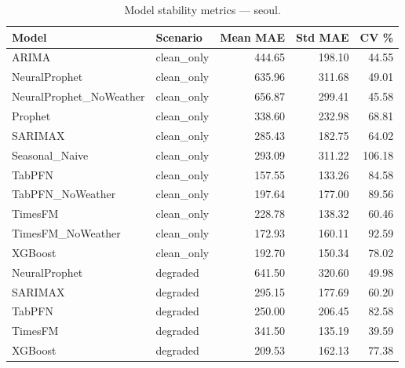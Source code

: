 \begin{table}[h]
\centering
\caption{Model stability metrics — seoul.}
\label{tab:stability_seoul}
\begin{tabular}{llrrr}
\toprule
Model & Scenario & Mean MAE & Std MAE & CV \% \\
\midrule
ARIMA & clean\_only & 444.65 & 198.10 & 44.55 \\
NeuralProphet & clean\_only & 635.96 & 311.68 & 49.01 \\
NeuralProphet_NoWeather & clean\_only & 656.87 & 299.41 & 45.58 \\
Prophet & clean\_only & 338.60 & 232.98 & 68.81 \\
SARIMAX & clean\_only & 285.43 & 182.75 & 64.02 \\
Seasonal_Naive & clean\_only & 293.09 & 311.22 & 106.18 \\
TabPFN & clean\_only & 157.55 & 133.26 & 84.58 \\
TabPFN_NoWeather & clean\_only & 197.64 & 177.00 & 89.56 \\
TimesFM & clean\_only & 228.78 & 138.32 & 60.46 \\
TimesFM_NoWeather & clean\_only & 172.93 & 160.11 & 92.59 \\
XGBoost & clean\_only & 192.70 & 150.34 & 78.02 \\
NeuralProphet & degraded & 641.50 & 320.60 & 49.98 \\
SARIMAX & degraded & 295.15 & 177.69 & 60.20 \\
TabPFN & degraded & 250.00 & 206.45 & 82.58 \\
TimesFM & degraded & 341.50 & 135.19 & 39.59 \\
XGBoost & degraded & 209.53 & 162.13 & 77.38 \\
\bottomrule
\end{tabular}
\end{table}
